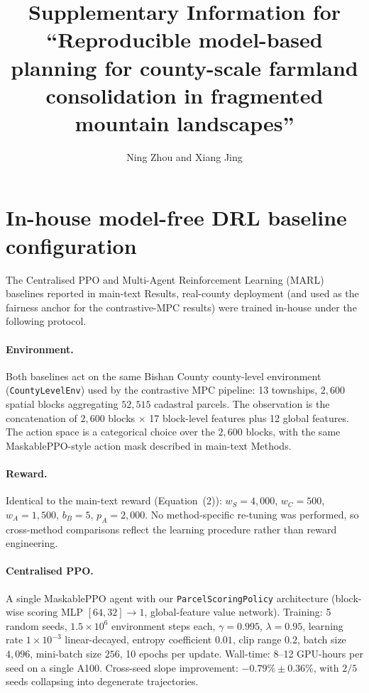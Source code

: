 \documentclass[11pt]{article}
\title{Supplementary Information for\\``Reproducible model-based planning for county-scale farmland consolidation in fragmented mountain landscapes''}
\author{Ning Zhou and Xiang Jing}
\date{}
\begin{document}
\maketitle
\sloppy  %

\section{In-house model-free DRL baseline configuration}\label{si:s1-drl}

The Centralised PPO and Multi-Agent Reinforcement Learning (MARL) baselines reported in main-text Results, real-county deployment (and used as the fairness anchor for the contrastive-MPC results) were trained in-house under the following protocol.

\paragraph{Environment.} Both baselines act on the same Bishan County county-level environment (\texttt{CountyLevelEnv}) used by the contrastive MPC pipeline: 13 townships, $2{,}600$ spatial blocks aggregating $52{,}515$ cadastral parcels. The observation is the concatenation of $2{,}600$ blocks $\times$ 17 block-level features plus 12 global features. The action space is a categorical choice over the $2{,}600$ blocks, with the same MaskablePPO-style action mask described in main-text Methods.

\paragraph{Reward.} Identical to the main-text reward (Equation~(2)): $w_S = 4{,}000$, $w_C = 500$, $w_A = 1{,}500$, $b_B = 5$, $p_A = 2{,}000$. No method-specific re-tuning was performed, so cross-method comparisons reflect the learning procedure rather than reward engineering.

\paragraph{Centralised PPO.} A single MaskablePPO agent with our \texttt{ParcelScoringPolicy} architecture (block-wise scoring MLP $[64, 32] \to 1$, global-feature value network). Training: 5 random seeds, $1.5 \times 10^6$ environment steps each, $\gamma = 0.995$, $\lambda = 0.95$, learning rate $1\times 10^{-3}$ linear-decayed, entropy coefficient $0.01$, clip range $0.2$, batch size $4{,}096$, mini-batch size $256$, 10 epochs per update. Wall-time: 8--12 GPU-hours per seed on a single A100. Cross-seed slope improvement: $-0.79\% \pm 0.36\%$, with $2/5$ seeds collapsing into degenerate trajectories.
\end{document}
